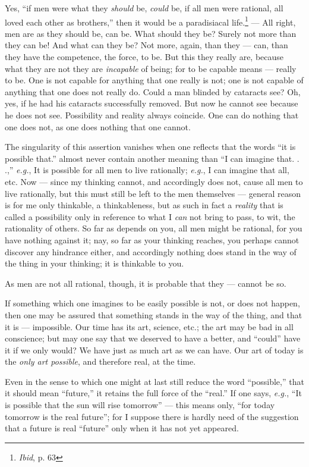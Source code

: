 Yes, ``if men were what they \textit{should} be, \textit{could} be, if all 
men were rational, all loved each other as brothers,'' then it would be a 
paradisiacal life.\footnote{\textit{Ibid}, p. 63} --- All right, men are as 
they should be, can be. What should they be? Surely not more than they can be! 
And what can they be? Not more, again, than they --- can, than they have the 
competence, the force, to be. But this they really are, because what they are 
not they are \textit{incapable} of being; for to be capable means --- really to 
be. One is not capable for anything that one really is not; one is not capable 
of anything that one does not really do. Could a man blinded by cataracts see? 
Oh, yes, if he had his cataracts successfully removed. But now he cannot see 
because he does not see. Possibility and reality always coincide. One can do 
nothing that one does not, as one does nothing that one cannot.

The singularity of this assertion vanishes when one reflects that the words 
``it is possible that.'' almost never contain another meaning than ``I can 
imagine that. . .,'' \textit{e.g.}, It is possible for all men to live 
rationally; \textit{e.g.}, I can imagine that all, etc. Now --- since my 
thinking cannot, and accordingly does not, cause all men to live rationally, 
but this must still be left to the men themselves --- general reason is for me 
only thinkable, a thinkableness, but as such in fact a \textit{reality} that 
is called a possibility only in reference to what I \textit{can} not bring to 
pass, to wit, the rationality of others. So far as depends on you, all men 
might be rational, for you have nothing against it; nay, so far as your 
thinking reaches, you perhaps cannot discover any hindrance either, and 
accordingly nothing does stand in the way of the thing in your thinking; it is 
thinkable to you.

As men are not all rational, though, it is probable that they --- cannot be so.

If something which one imagines to be easily possible is not, or does not 
happen, then one may be assured that something stands in the way of the thing, 
and that it is --- impossible. Our time has its art, science, etc.; the art may 
be bad in all conscience; but may one say that we deserved to have a better, 
and ``could'' have it if we only would? We have just as much art as we can 
have. Our art of today is the \textit{only art possible}, and therefore real, 
at the time.

Even in the sense to which one might at last still reduce the word 
``possible,'' that it should mean ``future,'' it retains the full force of 
the ``real.'' If one says, \textit{e.g.}, ``It is possible that the sun 
will rise tomorrow'' --- this means only, ``for today tomorrow is the real 
future''; for I suppose there is hardly need of the suggestion that a future 
is real ``future'' only when it has not yet appeared.


